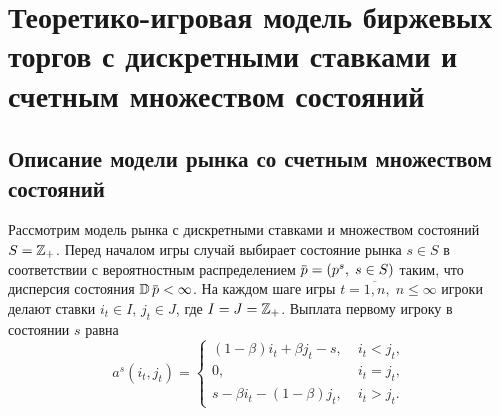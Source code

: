\chapter{Теоретико-игровая модель биржевых торгов с дискретными ставками и счетным множеством состояний} \label{chapt3}
{

\newcommand{\as}[1][\beta]{\ensuremath{a^{s,#1}}}
\newcommand{\s}{\ensuremath{s}}
\newcommand{\q}{\ensuremath{\overbar{q}}}
\newcommand{\theG}[1][n]{\ensuremath{G^\beta_{#1}}}
\newcommand{\K}[1][n]{\ensuremath{K^\beta_{#1}}}
\newcommand{\V}[1][n]{\ensuremath{V^\beta_{#1}}}
\newcommand{\High}[1][\ensuremath{\infty}]{\ensuremath{H^\beta_{#1}}}
\newcommand{\sigmav}{\ensuremath{\overbar{\sigma}}}
\newcommand{\tauv}{\ensuremath{\overbar{\tau}}}
\newcommand{\xiv}{\ensuremath{\overbar{\xi}}}
\newcommand{\sigmak}{\ensuremath{\hat{\sigma}}}
\newcommand{\Low}[1][\ensuremath{\infty}]{\ensuremath{L^\beta_{#1}}}

\section{Описание модели рынка со счетным множеством состояний}
\label{ch3:sec:model-descr}

Рассмотрим модель рынка с дискретными ставками и множеством состояний $S = \mathbb{Z}_+$.
Перед началом игры случай выбирает состояние рынка $\s \in S$ в соответствии с вероятностным распределением $\p = (p^s, \; s \in S)$ таким, что дисперсия состояния $\D \p < \infty$.
На каждом шаге игры $t = \overline{1,n}, \; n \leqslant \infty$ игроки делают ставки $i_t \in I, \, j_t \in J$, где $I = J = \mathbb{Z}_+$.
Выплата первому игроку в состоянии $s$ равна
\begin{equation*}
  a^s(i_t, j_t) =
  \begin{cases}
    (1-\beta) i_t + \beta j_t - s, &\; i_t < j_t, \\
    0, &\; i_t = j_t, \\
    s - \beta i_t - (1-\beta)j_t, &\; i_t > j_t.
  \end{cases}
\end{equation*}

}
